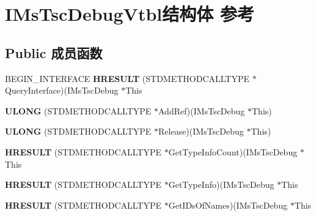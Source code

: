 \hypertarget{struct_i_ms_tsc_debug_vtbl}{}\section{I\+Ms\+Tsc\+Debug\+Vtbl结构体 参考}
\label{struct_i_ms_tsc_debug_vtbl}
\subsection*{Public 成员函数}
\begin{DoxyCompactItemize}
\item 
\mbox{\label{struct_i_ms_tsc_debug_vtbl_acfcb005e3d8e0d725c5974a1e80eece0}} 
B\+E\+G\+I\+N\+\_\+\+I\+N\+T\+E\+R\+F\+A\+CE {\bfseries H\+R\+E\+S\+U\+LT} (S\+T\+D\+M\+E\+T\+H\+O\+D\+C\+A\+L\+L\+T\+Y\+PE $\ast$Query\+Interface)(I\+Ms\+Tsc\+Debug $\ast$This
\item 
\mbox{\label{struct_i_ms_tsc_debug_vtbl_a7821cbe3980423dac9b8ec765b2912a1}} 
{\bfseries U\+L\+O\+NG} (S\+T\+D\+M\+E\+T\+H\+O\+D\+C\+A\+L\+L\+T\+Y\+PE $\ast$Add\+Ref)(I\+Ms\+Tsc\+Debug $\ast$This)
\item 
\mbox{\label{struct_i_ms_tsc_debug_vtbl_a9958164709c55f8a14102045900ebb2c}} 
{\bfseries U\+L\+O\+NG} (S\+T\+D\+M\+E\+T\+H\+O\+D\+C\+A\+L\+L\+T\+Y\+PE $\ast$Release)(I\+Ms\+Tsc\+Debug $\ast$This)
\item 
\mbox{\label{struct_i_ms_tsc_debug_vtbl_ac89162ce89be6d430ade901fcd3ed2ee}} 
{\bfseries H\+R\+E\+S\+U\+LT} (S\+T\+D\+M\+E\+T\+H\+O\+D\+C\+A\+L\+L\+T\+Y\+PE $\ast$Get\+Type\+Info\+Count)(I\+Ms\+Tsc\+Debug $\ast$This
\item 
\mbox{\label{struct_i_ms_tsc_debug_vtbl_a41da77f6703171b0aefcc66054fc02c4}} 
{\bfseries H\+R\+E\+S\+U\+LT} (S\+T\+D\+M\+E\+T\+H\+O\+D\+C\+A\+L\+L\+T\+Y\+PE $\ast$Get\+Type\+Info)(I\+Ms\+Tsc\+Debug $\ast$This
\item 
\mbox{\label{struct_i_ms_tsc_debug_vtbl_ad1970e067f853908ec6d4ba9f6808808}} 
{\bfseries H\+R\+E\+S\+U\+LT} (S\+T\+D\+M\+E\+T\+H\+O\+D\+C\+A\+L\+L\+T\+Y\+PE $\ast$Get\+I\+Ds\+Of\+Names)(I\+Ms\+Tsc\+Debug $\ast$This

\end{DoxyCompactItemize}
